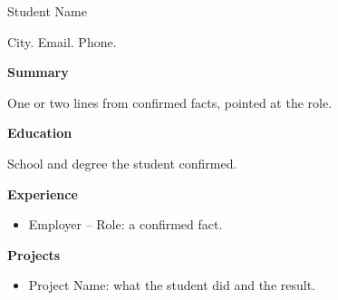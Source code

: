 \documentclass[11pt]{article}
\begin{document}
{\LARGE
Student Name
}

City. Email. Phone.

\vspace{0.6em}
\textbf{Summary}

One or two lines from confirmed facts, pointed at the role.

\vspace{0.6em}
\textbf{Education}

School and degree the student confirmed.

\vspace{0.6em}
\textbf{Experience}

\begin{itemize}
\item Employer -- Role: a confirmed fact.
\end{itemize}

\vspace{0.6em}
\textbf{Projects}

\begin{itemize}
\item Project Name: what the student did and the result.
\end{itemize}
\end{document}
